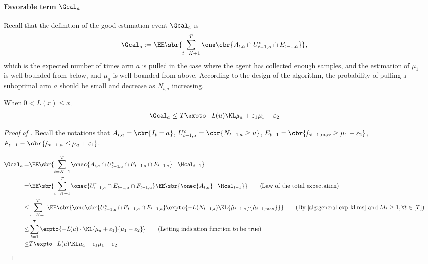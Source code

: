 \paragraph{Favorable term $\Gcal_{a}$}

Recall that the definition of the good estimation event $\Gcal_{a}$ is
\[
    \Gcal_{a} := \EE\sbr{ \sum_{t=K+1}^T
        \one\cbr{A_{t,a} \cap 
        U_{t-1, a}^c \cap 
        E_{t-1, a}
        }},
\]
which is the expected number of times arm $a$ is pulled in the case where the agent has collected enough samples, and the estimation of $\mu_1$ is well bounded from below, and $\mu_a$ is well bounded from above.
According to the design of the algorithm, the probability of pulling a suboptimal arm $a$ should be small and decrease as $N_{t,a}$ increasing.

    \begin{proposition} \label{pro:good}
    When $0 < L(x) \leq x$,
        \begin{align}
            \Gcal_{a} \leq \ExpFOne
                \label{eqn:good}
        \end{align}
    \end{proposition}
    \begin{proof}[Proof of ]
    Recall the notations that $A_{t,a} = \cbr{I_t = a}$, $U_{t-1,a}^c = \cbr{N_{t-1,a} \geq u}$, $E_{t-1} = \cbr{\hmu_{t-1,\max} \geq \mu_1-{\varepsilon_2}}$, 
    $F_{t-1} = \cbr{ \hmu_{t-1,a}\leq\mu_a+{\varepsilon_1} }$.

        \begin{align}
        \Gcal_{a}
        =&
            \EE\sbr{ \sum_{t=K+1}^T
                \onec{ {A_{t,a} \cap 
                    U_{t-1,a}^c \cap 
                    E_{t-1,a} \cap 
                    F_{t-1,a}
                    }
                } \mid \Hcal_{t-1}
            }
        \nonumber \\
        =&
            \EE\sbr{ \sum_{t=K+1}^T
                \onec{U_{t-1,a}^c \cap E_{t-1,a} \cap F_{t-1,a}} 
                \EE\sbr{\onec{A_{t,a}} \mid \Hcal_{t-1}}
            }
                \tag{Law of the total expectation}
        \\
        \leq&
            \sum_{t=K+1}^T
            \EE\sbr{ 
                \one\cbr{U_{t-1,a}^c \cap E_{t-1,a} \cap F_{t-1,a}}
                \expto{-L(N_{t-1,a}) \KL{\hmu_{t-1,a}}{\hmu_{t-1,\max}}}
            }
                \tag{By \Cref{alg:general-exp-kl-ms} and $M_t \geq 1, \forall t \in [T]$}
        \nonumber \\
        \leq&
            \sum_{t=1}^T
            \expto{-L(u) \cdot
                \KL{\mu_a+\varepsilon_1}{\mu_1-\varepsilon_2}}
                    \tag{Letting indication function to be true}
        \\
        \leq&
            \ExpFOne
                \label{eqn:F_1_upper_bound}
    \end{align}
    \end{proof}

